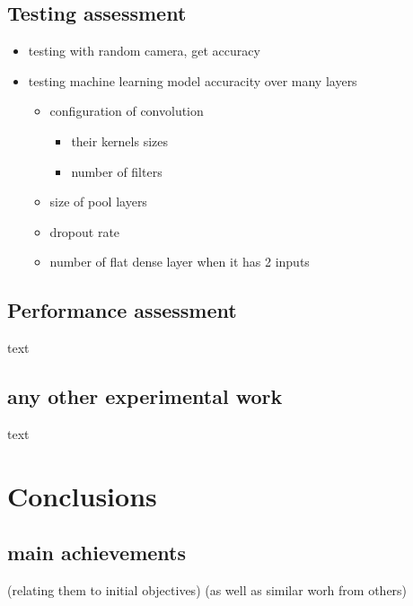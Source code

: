 \documentclass[
11pt,
twoside
]{report}
\begin{document}
\section{Testing assessment}

\begin{itemize}
\item
  testing with random camera, get accuracy
\item
  testing machine learning model accuracity over many layers

  \begin{itemize}
  \item
    configuration of convolution

    \begin{itemize}
    \item
      their kernels sizes
    \item
      number of filters
    \end{itemize}
  \item
    size of pool layers
  \item
    dropout rate
  \item
    number of flat dense layer when it has 2 inputs
  \end{itemize}
\end{itemize}



\section{Performance assessment}


text

\section{any other experimental work}


text

\chapter{Conclusions}



\section{main achievements}

    (relating them to initial objectives)
    (as well as similar worh from others)
\end{document}
